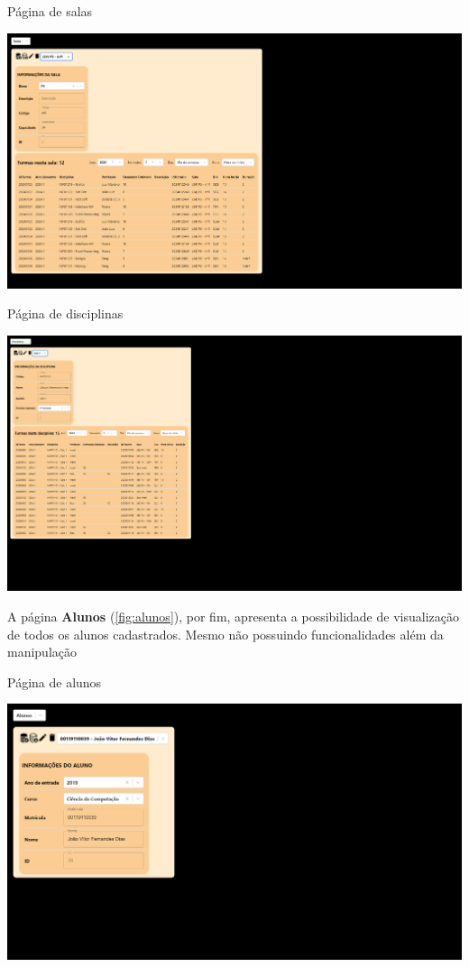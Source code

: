 \begin{MyCenteredFigure} \caption{Página de salas} \label{fig:salas}
  \includegraphics[width=\textwidth]{files/img/2.02!7-resultados/8-Salas.png}
\end{MyCenteredFigure}

\begin{MyCenteredFigure} \caption{Página de disciplinas} \label{fig:disciplinas}
  \includegraphics[width=\textwidth]{files/img/2.02!7-resultados/9-Disciplinas.png}
\end{MyCenteredFigure}

A página \textbf{Alunos} (\autoref{fig:alunos}), por fim, apresenta a possibilidade de visualização de todos os alunos cadastrados. Mesmo não possuindo funcionalidades além da manipulação

\begin{MyCenteredFigure} \caption{Página de alunos} \label{fig:alunos}
  \includegraphics[width=\textwidth]{files/img/2.02!7-resultados/10-Aluno.png}
\end{MyCenteredFigure}

